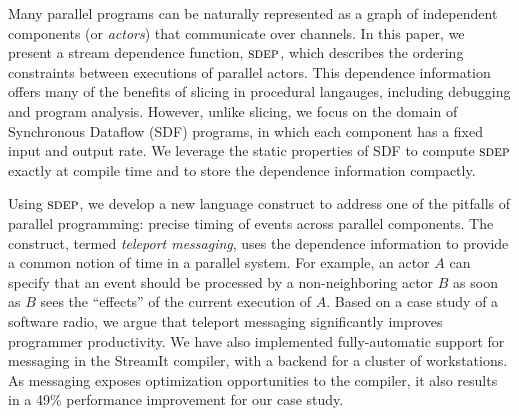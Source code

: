 Many parallel programs can be naturally represented as a graph of
independent components (or {\it actors}) that communicate over
channels.  In this paper, we present a stream dependence
function, $\textsc{sdep}$, which describes the ordering constraints between
executions of parallel actors.  This dependence information offers
many of the benefits of slicing in procedural langauges, including
debugging and program analysis.  However, unlike slicing, we focus on
the domain of Synchronous Dataflow (SDF) programs, in which each
component has a fixed input and output rate.  We leverage the static
properties of SDF to compute $\textsc{sdep}$ exactly at compile time and to
store the dependence information compactly.

Using $\textsc{sdep}$, we develop a new language construct to address one of
the pitfalls of parallel programming: precise timing of events across
parallel components.  The construct, termed {\it teleport messaging},
uses the dependence information to provide a common notion of time in
a parallel system.  For example, an actor $A$ can specify that an
event should be processed by a non-neighboring actor $B$ as soon as
$B$ sees the ``effects'' of the current execution of $A$.  Based on a
case study of a software radio, we argue that teleport messaging
significantly improves programmer productivity. We have also
implemented fully-automatic support for messaging in the StreamIt
compiler, with a backend for a cluster of workstations.  As messaging
exposes optimization opportunities to the compiler, it also results in
a 49\% performance improvement for our case study.
